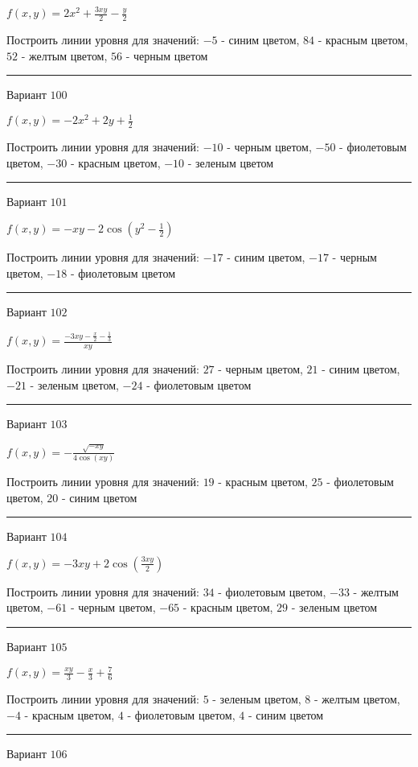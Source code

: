 \documentclass[11pt]{report}
\begin{document}
$f(x, y) = 2 x^{2} + \frac{3 x y}{2} - \frac{y}{2}$

Построить линии уровня для значений: $-5$ - синим цветом, $84$ - красным цветом, $52$ - желтым цветом, $56$ - черным цветом
\begin{center}
\noindent\rule{8cm}{0.4pt}
\end{center}
Вариант $100$


$f(x, y) = - 2 x^{2} + 2 y + \frac{1}{2}$

Построить линии уровня для значений: $-10$ - черным цветом, $-50$ - фиолетовым цветом, $-30$ - красным цветом, $-10$ - зеленым цветом
\begin{center}
\noindent\rule{8cm}{0.4pt}
\end{center}
Вариант $101$


$f(x, y) = - x y - 2 \cos{\left(y^{2} - \frac{1}{2} \right)}$

Построить линии уровня для значений: $-17$ - синим цветом, $-17$ - черным цветом, $-18$ - фиолетовым цветом
\begin{center}
\noindent\rule{8cm}{0.4pt}
\end{center}
Вариант $102$


$f(x, y) = \frac{- 3 x y - \frac{x}{2} - \frac{1}{3}}{x y}$

Построить линии уровня для значений: $27$ - черным цветом, $21$ - синим цветом, $-21$ - зеленым цветом, $-24$ - фиолетовым цветом
\begin{center}
\noindent\rule{8cm}{0.4pt}
\end{center}
Вариант $103$


$f(x, y) = - \frac{\sqrt{- x y}}{4 \cos{\left(x y \right)}}$

Построить линии уровня для значений: $19$ - красным цветом, $25$ - фиолетовым цветом, $20$ - синим цветом
\begin{center}
\noindent\rule{8cm}{0.4pt}
\end{center}
Вариант $104$


$f(x, y) = - 3 x y + 2 \cos{\left(\frac{3 x y}{2} \right)}$

Построить линии уровня для значений: $34$ - фиолетовым цветом, $-33$ - желтым цветом, $-61$ - черным цветом, $-65$ - красным цветом, $29$ - зеленым цветом
\begin{center}
\noindent\rule{8cm}{0.4pt}
\end{center}
Вариант $105$


$f(x, y) = \frac{x y}{3} - \frac{x}{3} + \frac{7}{6}$

Построить линии уровня для значений: $5$ - зеленым цветом, $8$ - желтым цветом, $-4$ - красным цветом, $4$ - фиолетовым цветом, $4$ - синим цветом
\begin{center}
\noindent\rule{8cm}{0.4pt}
\end{center}
Вариант $106$
\end{document}
